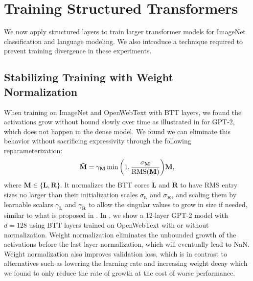 \documentclass{article}
\newcommand{\mbf}[1]{{\boldsymbol{\mathbf{#1}}}}
\newcommand{\bm}{\mbf}
\theoremstyle{plain}
\theoremstyle{definition}
\theoremstyle{remark}
\begin{document}
\section{Training Structured Transformers} \label{sec:trans}
We now apply structured layers to train larger transformer models for ImageNet classification and language modeling. We also introduce a technique required to prevent training divergence in these experiments.
%

\subsection{Stabilizing Training with Weight Normalization}
%
When training on ImageNet and OpenWebText with BTT layers, we found the activations grow without bound slowly over time as illustrated in  for GPT-2, which does not happen in the dense model.
We found we can eliminate this behavior without sacrificing expressivity through the following reparameterization:
%
\begin{align*}
    \bm{\tilde{M}} = \gamma_\bm{M} \min\qty(1, \frac{\sigma_\bm{M}}{\mathrm{RMS}(\bm{M})}) \bm{M},  
\end{align*}
where $\bm{M} \in \{\bm{L}, \bm{R}\}$. It normalizes the BTT cores $\bm{L}$ and $\bm{R}$ to have RMS entry sizes no larger than their initialization scales $\sigma_\bm{L}$ and $\sigma_\bm{R}$, and scaling them by learnable scalars $\gamma_\bm{L}$ and $\gamma_\bm{R}$ to allow the singular values to grow in size if needed, similar to what is proposed in \citet{salimans2016weight}.  In , we show a 12-layer GPT-2 model with $d = 128$ using BTT layers trained on OpenWebText with or without normalization. Weight normalization eliminates the unbounded growth of the activations before the last layer normalization, which will eventually lead to NaN. Weight normalization also improves validation loss, which is in contrast to alternatives such as lowering the learning rate and increasing weight decay which we found to only reduce the rate of growth at the cost of worse performance.
\end{document}
